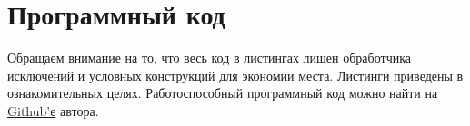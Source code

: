 \documentclass[a4paper,14pt]{extarticle}
\begin{document}
\tableofcontents
\newpage


\newpage

\newpage

\newpage

\newpage

\newpage





\newpage

\appendix
\section{Программный код}
\label{sec:code}
Обращаем внимание на то, что весь код в листингах лишен обработчика исключений
и условных конструкций  для экономии места. Листинги приведены в ознакомительных
целях. Работоспособный программный код можно найти на
\href{https://github.com/kannab98/diplom/}{Github'е} автора.




\end{document}
